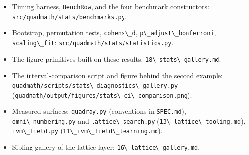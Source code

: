 \documentclass[
  10pt,
]{article}
\newcommand{\passthrough}[1]{#1}
\providecommand{\tightlist}{%
  \setlength{\itemsep}{0pt}\setlength{\parskip}{0pt}}
\begin{document}
\begin{itemize}
\tightlist
\item
  Timing harness, \passthrough{\lstinline!BenchRow!}, and the four
  benchmark constructors:
  \passthrough{\lstinline!src/quadmath/stats/benchmarks.py!}.
\item
  Bootstrap, permutation tests, \passthrough{\lstinline!cohens\_d!},
  \passthrough{\lstinline!p\_adjust\_bonferroni!},
  \passthrough{\lstinline!scaling\_fit!}:
  \passthrough{\lstinline!src/quadmath/stats/statistics.py!}.
\item
  The figure primitives built on these results:
  \passthrough{\lstinline!18\_stats\_gallery.md!}.
\item
  The interval-comparison script and figure behind the second example:
  \passthrough{\lstinline!quadmath/scripts/stats\_diagnostics\_gallery.py!}
  (\passthrough{\lstinline!quadmath/output/figures/stats\_ci\_comparison.png!}).
\item
  Measured surfaces: \passthrough{\lstinline!quadray.py!} (conventions
  in \passthrough{\lstinline!SPEC.md!}),
  \passthrough{\lstinline!omni\_numbering.py!} and
  \passthrough{\lstinline!lattice\_search.py!}
  (\passthrough{\lstinline!13\_lattice\_tooling.md!}),
  \passthrough{\lstinline!ivm\_field.py!}
  (\passthrough{\lstinline!11\_ivm\_field\_learning.md!}).
\item
  Sibling gallery of the lattice layer:
  \passthrough{\lstinline!16\_lattice\_gallery.md!}.
\end{itemize}
\end{document}

